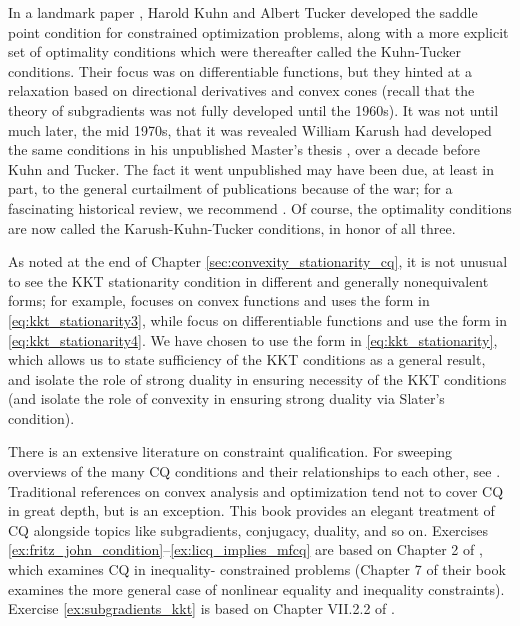 In a landmark paper \cite{kuhn1951nonlinear}, Harold Kuhn and Albert Tucker
developed the saddle point condition for constrained optimization problems,
along with a more explicit set of optimality conditions which were thereafter
called the Kuhn-Tucker conditions. Their focus was on differentiable functions,
but they hinted at a relaxation based on directional derivatives and
convex cones (recall that the theory of subgradients was not fully developed
until the 1960s). It was not until much later, the mid 1970s, that it was
revealed  William Karush had developed the same conditions in his unpublished
Master's thesis \cite{karush1939minima}, over a decade before Kuhn and 
Tucker. The fact it went unpublished may have been due, at least in part, to the  
general curtailment of publications because of the war; for a fascinating
historical review, we  recommend \cite{kuhn1976nonlinear,
  kjeldsen2000contextualized, cottle2012william}. Of course, the optimality
conditions are now called the Karush-Kuhn-Tucker conditions, in honor of all
three.     

As noted at the end of Chapter \ref{sec:convexity_stationarity_cq}, it is not
unusual to see the KKT stationarity condition in different and generally
nonequivalent forms; for example, \cite{rockafellar1970convex} focuses on convex
functions and uses the form in \eqref{eq:kkt_stationarity3}, while
\cite{boyd2004convex} focus on differentiable functions and use the form in 
\eqref{eq:kkt_stationarity4}. We have chosen to use the form 
in \eqref{eq:kkt_stationarity}, which allows us to state sufficiency of the KKT 
conditions as a general result, and isolate the role of strong duality in 
ensuring necessity of the KKT conditions (and isolate the role of convexity in
ensuring strong duality via Slater's condition). 

There is an extensive literature on constraint qualification. For sweeping
overviews of the many CQ conditions and their relationships to each other, 
see \cite{peterson1973review, giorgi2018guided}. Traditional references on
convex analysis and optimization tend not to cover CQ in great depth, but   
\cite{borwein2006convex} is an exception. This book provides an elegant
treatment of CQ alongside topics like subgradients, conjugacy, duality, and so
on. Exercises \ref{ex:fritz_john_condition}--\ref{ex:licq_implies_mfcq} are
based on Chapter 2 of \cite{borwein2006convex}, which examines CQ in inequality-
constrained problems (Chapter 7 of their book examines the more general case of 
nonlinear equality and inequality constraints). Exercise
\ref{ex:subgradients_kkt} is based on Chapter VII.2.2 of 
\cite{hiriartUrruty1993convex}. 


